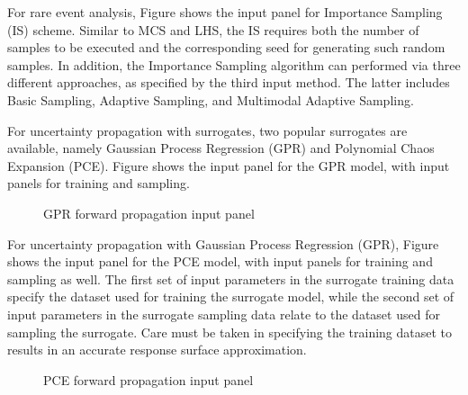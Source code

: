 For rare event analysis, Figure  shows the input panel for Importance Sampling (IS) scheme. Similar to MCS and LHS, the IS requires both the number of samples to be executed and the corresponding seed for generating such random samples. In addition, the Importance Sampling algorithm can performed via three different approaches, as specified by the third input method. The latter includes Basic Sampling, Adaptive Sampling, and Multimodal Adaptive Sampling. 


For uncertainty propagation with surrogates, two popular surrogates are available, namely Gaussian Process Regression (GPR) and Polynomial Chaos Expansion (PCE). Figure  shows the input panel for the GPR model, with input panels for training and sampling. 

\begin{figure}[!htbp]
  \caption{GPR forward propagation input panel}
  \label{fig:gpr}
\end{figure}

For uncertainty propagation with Gaussian Process Regression (GPR), Figure  shows the input panel for the PCE model, with input panels for training and sampling as well. The first set of input parameters in the surrogate training data specify the dataset used for training the surrogate model, while the second set of input parameters in the surrogate sampling data relate to the dataset used for sampling the surrogate. Care must be taken in specifying the training dataset to results in an accurate response surface approximation. 

\begin{figure}[!htbp]
  \caption{PCE forward propagation input panel}
  \label{fig:pce}
\end{figure}

